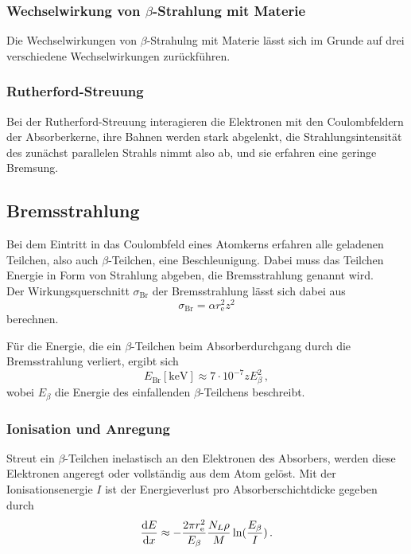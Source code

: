 \subsubsection*{Wechselwirkung von $\beta$-Strahlung mit Materie}

Die Wechselwirkungen von $\beta$-Strahulng mit Materie lässt sich
im Grunde auf drei verschiedene Wechselwirkungen zurückführen.

\subsubsection*{Rutherford-Streuung}

Bei der Rutherford-Streuung interagieren die Elektronen mit 
den Coulombfeldern der Absorberkerne, ihre Bahnen werden stark abgelenkt,
die Strahlungsintensität des zunächst parallelen Strahls nimmt also ab,
und sie erfahren eine geringe Bremsung.

\subsection*{Bremsstrahlung}

Bei dem Eintritt in das Coulombfeld eines Atomkerns erfahren
alle geladenen Teilchen, also auch $\beta$-Teilchen, eine Beschleunigung.
Dabei muss das Teilchen Energie in Form von Strahlung abgeben, die Bremsstrahlung genannt wird. \\

Der Wirkungsquerschnitt $\sigma_{\text{Br}}$ der Bremsstrahlung lässt
sich dabei aus
\begin{equation*}
    \sigma_{\text{Br}} = \alpha r_{\text{e}}^2 z^2
\end{equation*}
berechnen.

Für die Energie, die ein $\beta$-Teilchen beim Absorberdurchgang
durch die Bremsstrahlung verliert, ergibt sich
\begin{equation*}
    E_\text{Br}[\unit{\kilo\eV}] \approx 7 \cdot 10^{-7} z E_\beta^2 \,,
\end{equation*}
wobei $E_\beta$ die Energie des einfallenden $\beta$-Teilchens beschreibt.


\subsubsection*{Ionisation und Anregung}

Streut ein $\beta$-Teilchen inelastisch an den Elektronen des
Absorbers, werden diese Elektronen angeregt oder vollständig aus dem 
Atom gelöst.
Mit der Ionisationsenergie $I$ ist der Energieverlust pro Absorberschichtdicke
gegeben durch
\begin{equation*}
    \frac{\mathrm{d} E}{\mathrm{d} x} \approx - \frac{2 \pi r_\text{e}^2}{E_\beta} \frac{N_L \rho}{M}
    \ln(\frac{E_\beta}{I}) \,.
\end{equation*}


